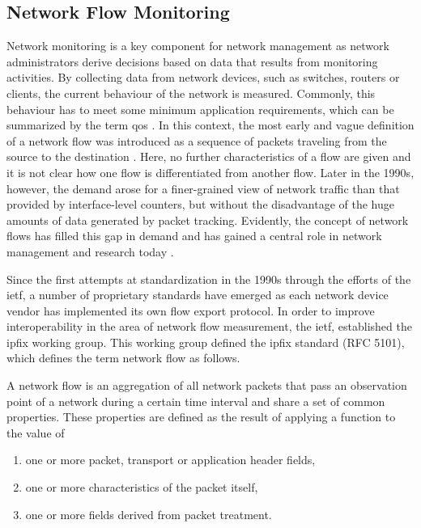 \subsection{Network Flow Monitoring}\label{subsec:network_flow_monitoring}

Network monitoring is a key component for network management as network administrators derive decisions based on data that results from monitoring activities. By collecting data from network devices, such as switches, routers or clients, the current behaviour of the network is measured. Commonly, this behaviour has to meet some minimum application requirements, which can be summarized by the term \gls{qos} \cite[406]{tanenbaum2021computer}. In this context, the most early and vague definition of a network flow was introduced as a sequence of packets traveling from the source to the destination \cite{clark1988design}. Here, no further characteristics of a flow are given and it is not clear how one flow is differentiated from another flow. Later in the 1990s, however, the demand arose for a finer-grained view of network traffic than that provided by interface-level counters, but without the disadvantage of the huge amounts of data generated by packet tracking. Evidently, the concept of network flows has filled this gap in demand and has gained a central role in network management and research today \cite{trammell2011introduction}.

Since the first attempts at standardization in the 1990s through the efforts of the \gls{ietf}, a number of proprietary standards have emerged as each network device vendor has implemented its own flow export protocol. In order to improve interoperability in the area of network flow measurement, the \gls{ietf}, established the \gls{ipfix} working group. This working group defined the \gls{ipfix} standard (RFC 5101), which defines the term network flow as follows.

\begin{definition}
A network flow is an aggregation of all network packets that pass an observation point of a network during a certain time interval and share a set of common properties. These properties are defined as the result of applying a function to the value of
\begin{enumerate}
    \item one or more packet, transport or application header fields,
    \item one or more characteristics of the packet itself,
    \item one or more fields derived from packet treatment.
\end{enumerate}

\end{definition}

